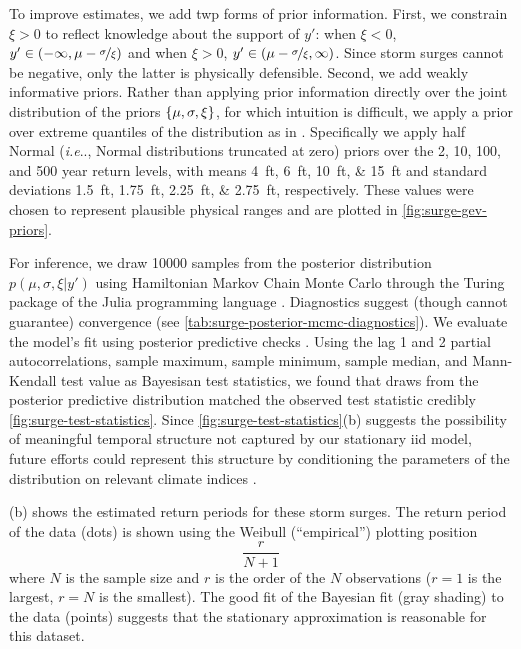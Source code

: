 \documentclass[12pt]{article}
\makeatletter
\DeclareRobustCommand\onedot{\futurelet\@let@token\@onedot}
\def\@onedot{\ifx\@let@token.\else.\null\fi\xspace}
\def\ie{\emph{i.e}\onedot} \def\Ie{\emph{I.e}\onedot}
\DeclareRobustCommand\onedot{\futurelet\@let@token\@onedot}
\def\@onedot{\ifx\@let@token.\else.\null\fi\xspace}
\def\ie{\emph{i.e}\onedot} \def\Ie{\emph{I.e}\onedot}
\makeatother
\begin{document}
To improve estimates, we add twp forms of prior information.
First, we constrain $\xi > 0$ to reflect knowledge about the support of $y'$: when $\xi < 0$, $y' \in \qty(-\infty, \mu - \nicefrac{\sigma}{\xi})$  and when $\xi > 0$, $y' \in \qty(\mu-\nicefrac{\sigma}{\xi}, \infty)$.
Since storm surges cannot be negative, only the latter is physically defensible.
Second, we add weakly informative priors.
Rather than applying prior information directly over the joint distribution of the priors $\qty{\mu,\sigma,\xi}$, for which intuition is difficult, we apply a prior over extreme quantiles of the distribution as in \citet{coles_evd:1996}.
Specifically we apply half Normal (\ie, Normal distributions truncated at zero) priors over the 2, 10, 100, and 500 year return levels, with means \SIlist{4;6;10;15}{ft} and standard deviations \SIlist{1.5;1.75;2.25;2.75}{ft}, respectively.
These values were chosen to represent plausible physical ranges and are plotted in \cref{fig:surge-gev-priors}.

For inference, we draw \num{10000} samples from the posterior distribution $p(\mu,\sigma,\xi | y')$ using Hamiltonian Markov Chain Monte Carlo \citep{Betancourt:2017vd,hoffman_nuts:2011} through the Turing package of the Julia programming language \citep{perkel_julia:2019,ge_turing:2018,tarek_dynamicppl:2020,besancon_distributions.jl:2021,bezanson_julia:2012}.
Diagnostics suggest (though cannot guarantee) convergence (see \cref{tab:surge-posterior-mcmc-diagnostics}).
We evaluate the model's fit using posterior predictive checks \citep[see section 2.4 of][and references therein]{gelman_workflow:2020}.
Using the lag 1 and 2 partial autocorrelations, sample maximum, sample minimum, sample median, and Mann-Kendall test value as Bayesisan test statistics, we found that draws from the posterior predictive distribution matched the observed test statistic credibly \cref{fig:surge-test-statistics}.
Since \cref{fig:surge-test-statistics}(b) suggests the possibility of meaningful temporal structure not captured by our stationary \gls{iid} model, future efforts  could represent this structure by conditioning the parameters of the distribution on relevant climate indices \citep[as in][]{wong_structural:2020}.

(b) shows the estimated return periods for these storm surges.
The return period of the data (dots) is shown using the Weibull (``empirical'') plotting position
\begin{equation}\label{eq:plot-pos}
    \frac{r}{N + 1}
\end{equation}
where $N$ is the sample size and $r$ is the order of the $N$ observations ($r=1$ is the largest, $r=N$ is the smallest).
The good fit of the Bayesian fit (gray shading) to the data (points) suggests that the stationary approximation is reasonable for this dataset.
\end{document}
